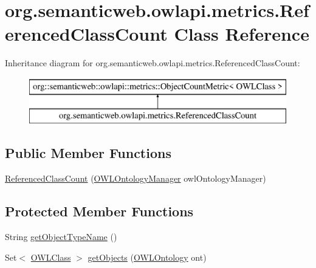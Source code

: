 \hypertarget{classorg_1_1semanticweb_1_1owlapi_1_1metrics_1_1_referenced_class_count}{\section{org.\-semanticweb.\-owlapi.\-metrics.\-Referenced\-Class\-Count Class Reference}
\label{classorg_1_1semanticweb_1_1owlapi_1_1metrics_1_1_referenced_class_count}
}
Inheritance diagram for org.\-semanticweb.\-owlapi.\-metrics.\-Referenced\-Class\-Count\-:\begin{figure}[H]
\begin{center}
\leavevmode
\includegraphics[height=2.000000cm]{classorg_1_1semanticweb_1_1owlapi_1_1metrics_1_1_referenced_class_count}
\end{center}
\end{figure}
\subsection*{Public Member Functions}
\begin{DoxyCompactItemize}
\item 
\hyperlink{classorg_1_1semanticweb_1_1owlapi_1_1metrics_1_1_referenced_class_count_a08d5ab32c113cef188e194cf08f1688c}{Referenced\-Class\-Count} (\hyperlink{interfaceorg_1_1semanticweb_1_1owlapi_1_1model_1_1_o_w_l_ontology_manager}{O\-W\-L\-Ontology\-Manager} owl\-Ontology\-Manager)
\end{DoxyCompactItemize}
\subsection*{Protected Member Functions}
\begin{DoxyCompactItemize}
\item 
String \hyperlink{classorg_1_1semanticweb_1_1owlapi_1_1metrics_1_1_referenced_class_count_ab95f731817a6911431b619354f93b7ce}{get\-Object\-Type\-Name} ()
\item 
Set$<$ \hyperlink{interfaceorg_1_1semanticweb_1_1owlapi_1_1model_1_1_o_w_l_class}{O\-W\-L\-Class} $>$ \hyperlink{classorg_1_1semanticweb_1_1owlapi_1_1metrics_1_1_referenced_class_count_a70623b5352164aaf0812a5db5f9c582e}{get\-Objects} (\hyperlink{interfaceorg_1_1semanticweb_1_1owlapi_1_1model_1_1_o_w_l_ontology}{O\-W\-L\-Ontology} ont)
\end{DoxyCompactItemize}


